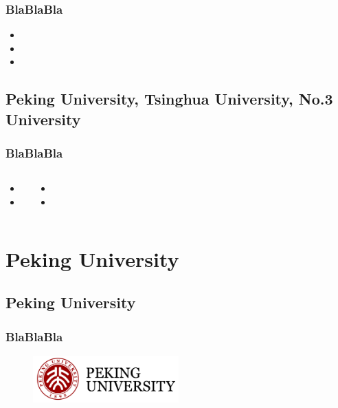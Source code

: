 \documentclass[hyperref={bookmarks=false},aspectratio=169]{beamer}
\begin{document}
	\begin{frame}
	\frametitle{BlaBlaBla}

\begin{itemize}
	\item 
	\item 
	\item 
\end{itemize}

\end{frame}	

     \subsection{Peking University, Tsinghua University, No.3 University}
\begin{frame}
	\frametitle{BlaBlaBla}

\begin{columns}
	

	\begin{itemize}
		\item 
		\item 
	\end{itemize}
	

	\begin{itemize}
		\item 
		\item 
	\end{itemize}
	
	\end{columns}

\end{frame}		\section{Peking University}
		
		\subsection{Peking University}
	\begin{frame}
	\frametitle{BlaBlaBla}

\begin{figure}
    \centering
    \includegraphics[width=0.5\textwidth]{./figures/1}
\end{figure}

\end{frame}	
	
\end{document}
